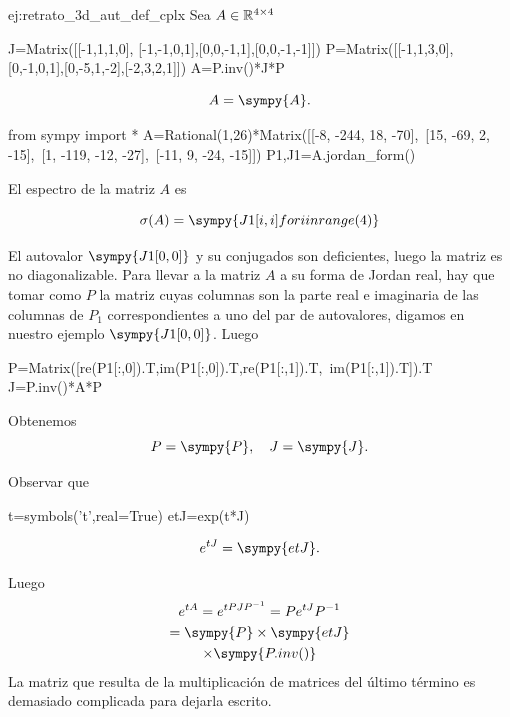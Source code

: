 \begin{ejemplo}{ej:retrato_3d_aut_def_cplx} Sea $A\in\mathbb{R}^{4\times 4}$ 
 
 \begin{sympycode}
J=Matrix([[-1,1,1,0], [-1,-1,0,1],[0,0,-1,1],[0,0,-1,-1]])
P=Matrix([[-1,1,3,0], [0,-1,0,1],[0,-5,1,-2],[-2,3,2,1]])
A=P.inv()*J*P
 \end{sympycode}

 \[
  A=\sympy{A}.
 \]

 \begin{sympyblock}[][numbers=left,frame=single,framesep=5mm]
from sympy import *
A=Rational(1,26)*Matrix([[-8, -244, 18, -70],\
[15, -69, 2, -15],\
[1, -119, -12, -27],\
[-11, 9, -24, -15]])
P1,J1=A.jordan_form()
\end{sympyblock}
 
 

El espectro de la matriz $A$ es 

$$\sigma(A)=\sympy{ {J1[i,i] for i in range(4)} }$$

El autovalor $\sympy{J1[0,0]}$ y su conjugados son deficientes, luego la matriz es no diagonalizable. Para llevar a la matriz $A$ a su forma de Jordan real, hay que tomar como $P$ la matriz cuyas columnas son  la parte real e imaginaria de las columnas de $P_1$ correspondientes a uno del par de autovalores, digamos en nuestro ejemplo $\sympy{J1[0,0]}$. Luego

\begin{sympyblock}[][numbers=left,frame=single,framesep=5mm]
P=Matrix([re(P1[:,0]).T,im(P1[:,0]).T,re(P1[:,1]).T,\
    im(P1[:,1]).T]).T
J=P.inv()*A*P
\end{sympyblock} 

Obtenemos
\[
 P=\sympy{P},\quad J=\sympy{J}. 
\]

 Observar que
 \begin{sympycode}
t=symbols('t',real=True)
etJ=exp(t*J)
 \end{sympycode}

 
 \[
  e^{tJ}=\sympy{etJ}.
 \]

 Luego
{\small
 \begin{multline*}
  e^{tA}=e^{tPJP^{-1}}=Pe^{tJ}P^{-1}\\
  =\sympy{P}\times\sympy{etJ}\\ \times \sympy{P.inv()}\\
 \end{multline*}
 }
La matriz que resulta de la multiplicación de matrices del último término es demasiado complicada para dejarla escrito. 

 
\end{ejemplo}





